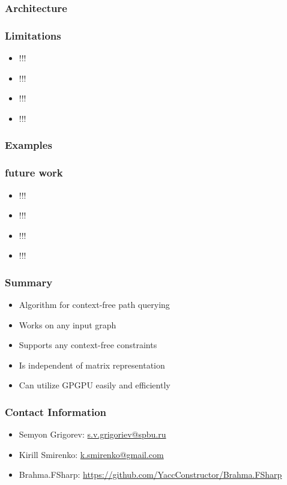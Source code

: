 \documentclass[xcolor=table]{beamer}
\begin{document}
       

       
            
\begin{frame}
  \transwipe[direction=90]
  \frametitle{Architecture}

\end{frame}

\begin{frame}
  \transwipe[direction=90]
  \frametitle{Limitations }
  \begin{itemize}
\item !!!
\item !!!
\item !!!
\item !!!
\end{itemize}

\end{frame}

            
\begin{frame}
  \transwipe[direction=90]
  \frametitle{Examples}         
\end{frame}     

\begin{frame}
  \transwipe[direction=90]
  \frametitle{future work}         
\begin{itemize}
\item !!!
\item !!!
\item !!!
\item !!!
\end{itemize}
\end{frame}     
            
            
\begin{frame}
  \transwipe[direction=90]
  \frametitle{Summary}         
\begin{itemize}
\item Algorithm for context-free path querying 
\item Works on any input graph
\item Supports any context-free constraints 
\item Is independent of matrix representation
\item Can utilize GPGPU easily and efficiently 
\end{itemize}
\end{frame}           
            
\begin{frame}
\transwipe[direction=90]
\frametitle{Contact Information}
\begin{itemize}
  \item Semyon Grigorev: \href{mailto:s.v.grigoriev@spbu.ru}{s.v.grigoriev@spbu.ru}
  \item Kirill Smirenko: \href{mailto:k.smirenko@gmail.com}{k.smirenko@gmail.com}
\end{itemize}
\begin{itemize}
  \item Brahma.FSharp: \href{https://github.com/YaccConstructor/Brahma.FSharp}{https://github.com/YaccConstructor/Brahma.FSharp}
\end{itemize}
\end{frame}
\end{document}
